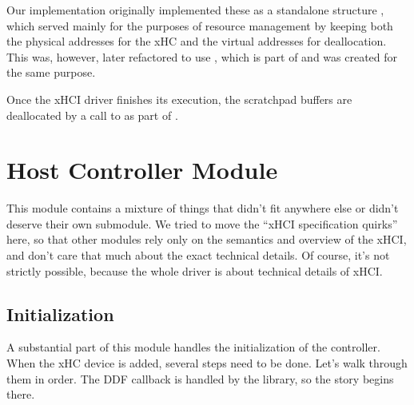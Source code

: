 Our implementation originally implemented these as a standalone structure ,
which served mainly for the purposes of resource management by keeping both the physical addresses
for the xHC and the virtual addresses for deallocation. This was, however, later refactored to use
, which is part of  and was created for the same purpose.

Once the xHCI driver finishes its execution, the scratchpad buffers are deallocated by a call to
 as part of .




\section{Host Controller Module}

This module contains a mixture of things that didn't fit anywhere else or
didn't deserve their own submodule. We tried to move the ``xHCI specification
quirks'' here, so that other modules rely only on the semantics and overview of
the xHCI, and don't care that much about the exact technical details. Of
course, it's not strictly possible, because the whole driver is about technical
details of xHCI.

\subsection{Initialization}

A substantial part of this module handles the initialization of the controller.
When the xHC device is added, several steps need to be done. Let's walk through
them in order. The DDF callback  is handled by the
 library, so the story begins there.

